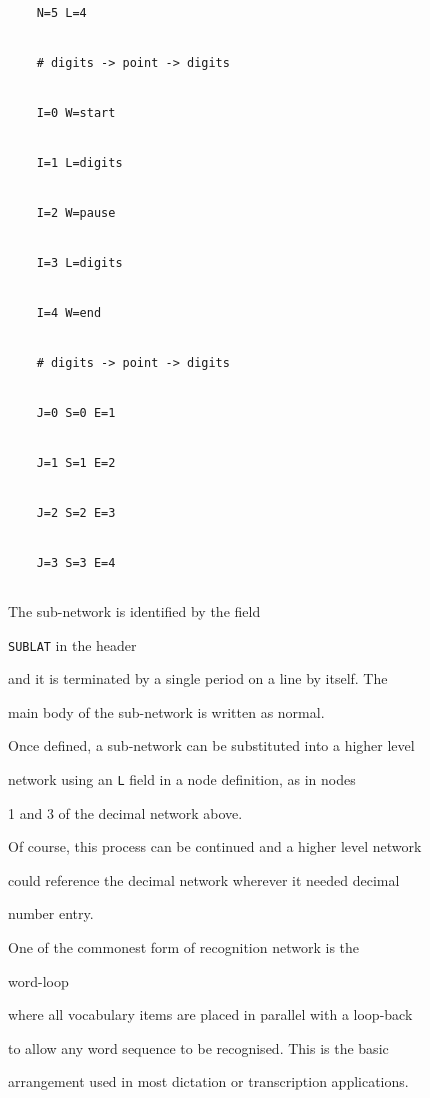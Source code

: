 \begin{verbatim}
    N=5 L=4


    # digits -> point -> digits


    I=0 W=start


    I=1 L=digits


    I=2 W=pause


    I=3 L=digits


    I=4 W=end


    # digits -> point -> digits


    J=0 S=0 E=1


    J=1 S=1 E=2


    J=2 S=2 E=3


    J=3 S=3 E=4


\end{verbatim}


The sub-network is identified by the field 


\texttt{SUBLAT} in the header


and it is terminated by a single period on a line by itself.  The


main body of the sub-network is written as normal.


Once defined, a sub-network can be substituted into a higher level


network using an \texttt{L} field in a node definition, as in nodes


1 and 3 of the decimal network above.





Of course, this process can be continued and a higher level network


could reference the decimal network wherever it needed decimal


number entry.










One of the commonest form of recognition network is the 


word-loop


where all vocabulary items are placed in parallel with a loop-back


to allow any word sequence to be recognised.  This is the basic


arrangement used in most dictation or transcription applications.


